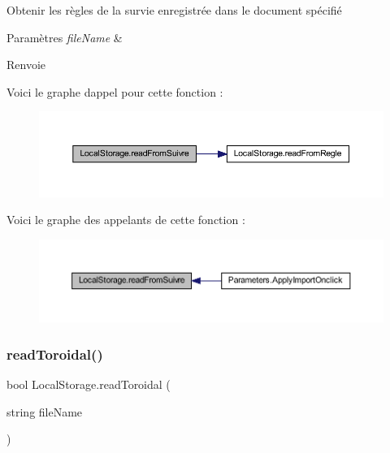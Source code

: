 Obtenir les règles de la survie enregistrée dans le document spécifié 


\begin{DoxyParams}{Paramètres}
{\em file\+Name} & \\
\hline
\end{DoxyParams}
\begin{DoxyReturn}{Renvoie}

\end{DoxyReturn}
Voici le graphe d\textquotesingle{}appel pour cette fonction \+:
\nopagebreak
\begin{figure}[H]
\begin{center}
\leavevmode
\includegraphics[width=350pt]{class_local_storage_a0c0003569be45cff5fda794e42243c1e_cgraph}
\end{center}
\end{figure}
Voici le graphe des appelants de cette fonction \+:
\nopagebreak
\begin{figure}[H]
\begin{center}
\leavevmode
\includegraphics[width=350pt]{class_local_storage_a0c0003569be45cff5fda794e42243c1e_icgraph}
\end{center}
\end{figure}
\mbox{\label{class_local_storage_a9197311a356432fa7a9480c69f42dd9c}} 
\subsubsection{\texorpdfstring{read\+Toroidal()}{readToroidal()}}
{\footnotesize\ttfamily bool Local\+Storage.\+read\+Toroidal (\begin{DoxyParamCaption}\item[{string}]{file\+Name }\end{DoxyParamCaption})\hspace{0.3cm}{\ttfamily [inline]}}

